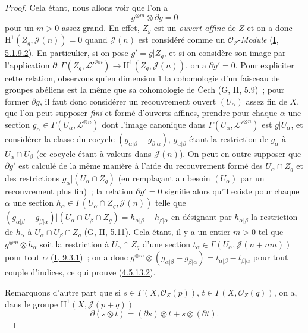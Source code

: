 \begin{proof}
Cela étant, nous allons voir que l'on a
\begin{equation}
\label{II.4.5.13.2-fr}
  g^{\otimes m}\otimes\partial g=0
\tag{4.5.13.2}
\end{equation}
pour un $m>0$ assez grand. En effet, $Z_g$ est un \emph{ouvert affine} de $Z$ et
on a donc $\mathrm{H}^1(Z_g,\mathcal{J}(n))=0$ quand $\mathcal{J}(n)$ est
considéré comme un $\mathcal{O}_Z$-\emph{Module}
(\hyperref[I.5.1.9.2-fr]{\textbf{I}, 5.1.9.2}). En particulier, si on pose
$g'=g|Z_g$, et si on considère son image par l'application
$\partial:\Gamma(Z_g,\mathcal{L}'^{\otimes n})\to
\mathrm{H}^1(Z_g,\mathcal{J}(n))$, on a $\partial g'=0$. Pour expliciter
cette relation, observons qu'en dimension $1$ la cohomologie d'un faisceau
de groupes abéliens est la même que sa cohomologie de Čech (G, II, 5.9)~;
pour former $\partial g$, il faut donc considérer un recouvrement ouvert
$(U_\alpha)$ assez fin de $X$, que l'on peut supposer \emph{fini} et formé
d'ouverts affines, prendre pour chaque $\alpha$ une section
$g_\alpha\in\Gamma(U_\alpha,\mathcal{L}^{\otimes n})$ dont l'image
canonique dans $\Gamma(U_\alpha,\mathcal{L}'^{\otimes n})$ est
$g|U_\alpha$, et considérer la classe du cocycle
$(g_{\alpha|\beta}-g_{\beta|\alpha})$, $g_{\alpha|\beta}$ étant la
restriction de $g_\alpha$ à $U_\alpha\cap U_\beta$ (ce cocycle étant à
valeurs dans $\mathcal{J}(n)$). On peut en outre supposer que $\partial g'$
est calculé de la même manière à l'aide du recouvrement formé des
$U_\alpha\cap Z_g$ et des restrictions $g_\alpha|(U_\alpha\cap Z_g)$ (en
remplaçant au besoin $(U_\alpha)$ par un recouvrement plus fin)~; la
relation $\partial g'=0$ signifie alors qu'il existe pour chaque $\alpha$
une section $h_\alpha\in\Gamma(U_\alpha\cap Z_g,\mathcal{J}(n))$ telle que
$(g_{\alpha|\beta}-g_{\beta|\alpha})
|(U_\alpha\cap U_\beta\cap Z_g)
=h_{\alpha|\beta}-h_{\beta|\alpha}$
en désignant par $h_{\alpha|\beta}$ la restriction de $h_\alpha$ à
$U_\alpha\cap U_\beta\cap Z_g$ (G, II, 5.11). Cela étant, il y a un entier
$m>0$ tel que $g^{\otimes m}\otimes h_\alpha$ soit la restriction à
$U_\alpha\cap Z_g$ d'une section
$t_\alpha\in\Gamma(U_\alpha,\mathcal{J}(n+nm))$ pour tout $\alpha$
(\hyperref[I.9.3.1-fr]{\textbf{I}, 9.3.1})~; on a donc
$g^{\otimes m}\otimes(g_{\alpha|\beta}-g_{\beta|\alpha})
=t_{\alpha|\beta}-t_{\beta|\alpha}$
pour tout couple d'indices, ce qui prouve
(\hyperref[II.4.5.13.2-fr]{4.5.13.2}).

Remarquons d'autre part que si
$s\in\Gamma(X,\mathcal{O}_Z(p))$,
$t\in\Gamma(X,\mathcal{O}_Z(q))$, on a, dans le groupe
$\mathrm{H}^1(X,\mathcal{J}(p+q))$
\begin{equation}
\label{II.4.5.13.3-fr}
  \partial(s\otimes t)=(\partial s)\otimes t+s\otimes(\partial t).
\tag{4.5.13.3}
\end{equation}


\end{proof}
